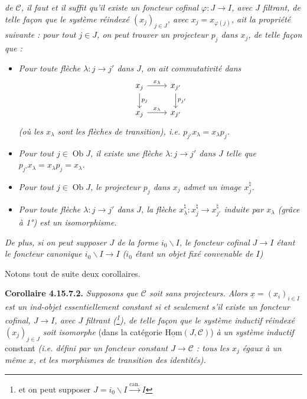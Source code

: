 \documentclass[11pt]{article}
\newcommand{\msp}[1]{\marginpar{\footnotesize [#1]}}
\newcommand{\cC}{\mathcal{C}}
\newcommand{\Ob}{\operatorname{Ob}}
\newcommand{\ux}{\underline{x}}
\begin{document}
\msp{page 441}
\textit{de $\cC$, il faut et il suffit qu'il existe un foncteur cofinal $\varphi : J \longrightarrow I$, avec $J$ filtrant, de telle façon que le système réindexé $(x_j)_{j\in J}$, avec $x_j = x_{\varphi(j)}$, ait la propriété suivante : pour tout $j \in J$, on peut trouver un projecteur $p_j$ dans $x_j$, de telle façon que :}
\begin{itemize}
\item[\textit{1°)}] \textit{Pour toute flèche $\lambda : j \longrightarrow j'$ dans $J$, on ait commutativité dans}
\[
\begin{tikzcd}
x_j \arrow[r, "x_\lambda"] \arrow[d, "p_j"] & x_{j'} \arrow[d, "p_{j'}"] \\
x_j \arrow[r, "x_\lambda"] & x_{j'}
\end{tikzcd}
\]
\textit{(où les $x_\lambda$ sont les flèches de transition), i.e. $p_{j'}x_\lambda = x_\lambda p_j$.}
\item[\textit{2°)}] \textit{Pour tout $j \in \Ob J$, il existe une flèche $\lambda : j \longrightarrow j'$ dans $J$ telle que $p_{j'}x_\lambda = x_\lambda p_j = x_\lambda$.}
\item[\textit{3°)}] \textit{Pour tout $j \in \Ob J$, le projecteur $p_j$ dans $x_j$ admet un image $x_j^\natural$.} %
\item[\textit{4°)}] \textit{Pour toute flèche $\lambda : j \longrightarrow j'$ dans $J$, la flèche $x_\lambda^\natural : x_j^\natural \longrightarrow x_{j'}^\natural$ induite par $x_\lambda$ (grâce à 1°) est un isomorphisme.}
\end{itemize}
\textit{De plus, si on peut supposer $J$ de la forme $i_0\backslash I$, le foncteur cofinal $J \longrightarrow I$ étant le foncteur canonique $i_0\backslash I \longrightarrow I$ ($i_0$ étant un objet fixé convenable de $I$)}

\msp{page 442}
Notons tout de suite deux corollaires.

\textbf{Corollaire 4.15.7.2.} \textit{Supposons que $\cC$ soit sans projecteurs. Alors $\ux = (x_i)_{i\in I}$ est un ind-objet essentiellement constant si et seulement s'il existe un foncteur cofinal, $J \longrightarrow I$, avec $J$ filtrant (\footnote{et on peut supposer $J = i_0\backslash I \xrightarrow{\text{can.}} I$}), de telle façon que le système inductif réindexé $(x_j)_{j\in J}$ soit isomorphe} (dans la catégorie $\underline{\mathrm{Hom}}(J,\cC)$) \textit{à un système inductif} constant \textit{(i.e. défini par un foncteur constant $J \longrightarrow \cC$ : tous les $x_j$ égaux à un même $x$, et les morphismes de transition des identités).}
\end{document}
